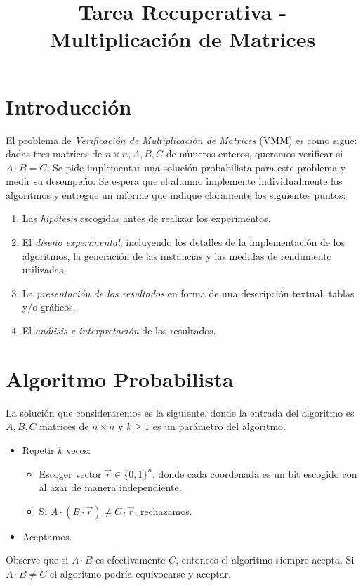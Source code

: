 \documentclass[dcc,uchile]{fcfmcourse}
\title{Tarea Recuperativa - Multiplicación de Matrices}
\begin{document}
\captionsetup[table]{name=Tabla}
\captionsetup[table]{name=Figura}

\maketitle
\vspace{-1ex}
\section{Introducción}
El problema de \textit{Verificación de Multiplicación de Matrices} (VMM) es como sigue: dadas tres matrices de $n \times n, A, B, C$ de números enteros, queremos verificar si $A\cdot B = C$. Se pide implementar una solución probabilista para este problema y medir su desempeño. Se espera que el alumno implemente individualmente los algoritmos y entregue un informe que indique claramente los siguientes puntos:
\begin{enumerate}[1.]
    \item Las \textit{hipótesis} escogidas antes de realizar los experimentos.
    \item El \textit{diseño experimental}, incluyendo los detalles de la implementación de los algoritmos, la generación de las instancias y las medidas de rendimiento utilizadas.
    \item La \textit{presentación de los resultados} en forma de una descripción textual, tablas y/o gráficos.
    \item El \textit{análisis e interpretación} de los resultados.
\end{enumerate}
\section{Algoritmo Probabilista}
La solución que consideraremos es la siguiente, donde la entrada del algoritmo es $A, B, C$ matrices de $n\times n$ y $k\ge 1$ es un parámetro del algoritmo.
\begin{itemize}
    \item Repetir $k$ veces:
    \begin{itemize}
        \item Escoger vector $\vec{r}\in \{0,1\}^n$, donde cada coordenada es un bit escogido con al azar de manera independiente.
        \item Si $A\cdot \left(B\cdot \vec{r}\right) \not = C \cdot \vec{r}$, rechazamos.
    \end{itemize}
    \item Aceptamos.
\end{itemize}
Observe que si $A\cdot B$ es efectivamente $C$, entonces el algoritmo siempre acepta. Si $A\cdot B \not = C$ el algoritmo podría equivocarse y aceptar.
\end{document}
